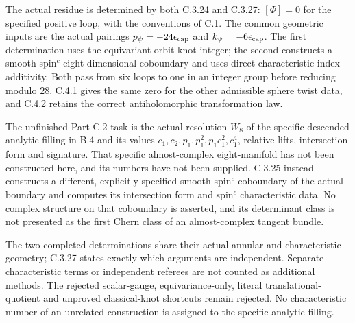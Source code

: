\begin{problem}
The actual residue is determined by both C.3.24 and C.3.27:
$[\Phi]=0$ for the specified positive loop, with the conventions
of C.1. The common geometric inputs are the actual pairings
$p_\psi=-24\epsilon_{\rm cap}$ and
$k_\psi=-6\epsilon_{\rm cap}$. The first determination uses
the equivariant orbit-knot integer; the second constructs a
smooth spin$^c$ eight-dimensional coboundary and uses direct
characteristic-index additivity. Both pass from six loops to
one in an integer group before reducing modulo $28$. C.4.1
gives the same zero for the other admissible sphere twist data,
and C.4.2 retains the correct antiholomorphic transformation law.

The unfinished Part C.2 task is the actual resolution $W_8$ of
the specific descended analytic filling in B.4 and its values
$c_1,c_2,p_1,p_1^2,p_1c_1^2,c_1^4$, relative lifts, intersection
form and signature. That specific almost-complex eight-manifold
has not been constructed here, and its numbers have not been
supplied. C.3.25 instead constructs a different, explicitly
specified smooth spin$^c$ coboundary of the actual boundary and
computes its intersection form and spin$^c$ characteristic data.
No complex structure on that coboundary is asserted, and its
determinant class is not presented as the first Chern class of
an almost-complex tangent bundle.

The two completed determinations share their actual annular and
characteristic geometry; C.3.27 states exactly which arguments
are independent. Separate characteristic terms or independent
referees are not counted as additional methods. The rejected
scalar-gauge, equivariance-only, literal translational-quotient
and unproved classical-knot shortcuts remain rejected. No
characteristic number of an unrelated construction is assigned
to the specific analytic filling.
\end{problem}
